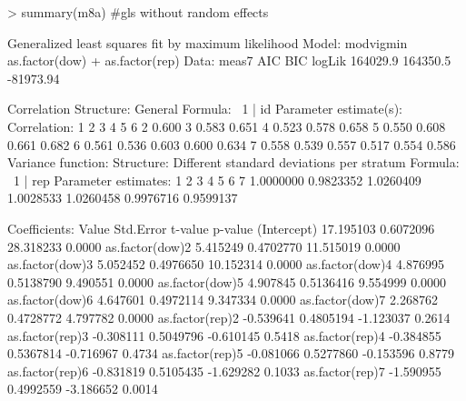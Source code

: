 \documentclass[11pt]{article}
\begin{document}
\begin{Schunk}
\begin{Sinput}
> summary(m8a) #gls without random effects
\end{Sinput}
\begin{Soutput}
Generalized least squares fit by maximum likelihood
  Model: modvigmin ~ as.factor(dow) + as.factor(rep) 
  Data: meas7 
       AIC      BIC    logLik
  164029.9 164350.5 -81973.94

Correlation Structure: General
 Formula: ~1 | id 
 Parameter estimate(s):
 Correlation: 
  1     2     3     4     5     6    
2 0.600                              
3 0.583 0.651                        
4 0.523 0.578 0.658                  
5 0.550 0.608 0.661 0.682            
6 0.561 0.536 0.603 0.600 0.634      
7 0.558 0.539 0.557 0.517 0.554 0.586
Variance function:
 Structure: Different standard deviations per stratum
 Formula: ~1 | rep 
 Parameter estimates:
        1         2         3         4         5         6         7 
1.0000000 0.9823352 1.0260409 1.0028533 1.0260458 0.9976716 0.9599137 

Coefficients:
                    Value Std.Error   t-value p-value
(Intercept)     17.195103 0.6072096 28.318233  0.0000
as.factor(dow)2  5.415249 0.4702770 11.515019  0.0000
as.factor(dow)3  5.052452 0.4976650 10.152314  0.0000
as.factor(dow)4  4.876995 0.5138790  9.490551  0.0000
as.factor(dow)5  4.907845 0.5136416  9.554999  0.0000
as.factor(dow)6  4.647601 0.4972114  9.347334  0.0000
as.factor(dow)7  2.268762 0.4728772  4.797782  0.0000
as.factor(rep)2 -0.539641 0.4805194 -1.123037  0.2614
as.factor(rep)3 -0.308111 0.5049796 -0.610145  0.5418
as.factor(rep)4 -0.384855 0.5367814 -0.716967  0.4734
as.factor(rep)5 -0.081066 0.5277860 -0.153596  0.8779
as.factor(rep)6 -0.831819 0.5105435 -1.629282  0.1033
as.factor(rep)7 -1.590955 0.4992559 -3.186652  0.0014


\end{Soutput}
\end{Schunk}
\end{document}
